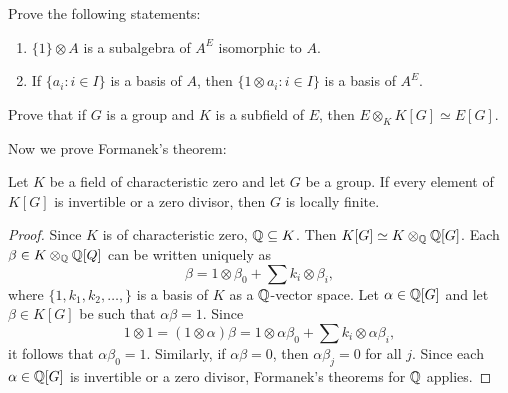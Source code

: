 \begin{exercise}
    Prove the following statements:
    \begin{enumerate}
		\item $\{1\}\otimes A$ is a subalgebra of $A^E$ isomorphic to $A$.
		\item If $\{a_i:i\in I\}$ is a basis of $A$, then $\{1\otimes a_i:i\in
			I\}$ is a basis of $A^E$.
	\end{enumerate}
\end{exercise}

\begin{exercise}
	Prove that if $G$ is a group and $K$ is a subfield of $E$, then
	$E\otimes_K K[G]\simeq E[G]$.
\end{exercise}

Now we prove Formanek's theorem:

\begin{theorem}[Formanek]
	Let $K$ be a field of characteristic zero and let $G$ be a group. 
	If every element of $K[G]$ is invertible or a zero divisor, 
	then $G$ is locally finite. 
\end{theorem}

\begin{proof}
	Since $K$ is of characteristic zero, $\mathbb{Q}\subseteq K$. Then $K[G]\simeq
	K\otimes_{\mathbb{Q}}\mathbb{Q}[G]$. Each $\beta\in K\otimes_{\mathbb{Q}}\mathbb{Q}[Q]$ can be written
	uniquely as 
	\[
		\beta=1\otimes\beta_0+\sum k_i\otimes\beta_i,
	\]
	where $\{1,k_1,k_2,\dots,\}$ is a basis of $K$ as a $\mathbb{Q}$-vector space. 
	Let $\alpha\in\mathbb{Q}[G]$ and let $\beta\in K[G]$ be such that $\alpha\beta=1$. Since
	\[
	1\otimes 1=(1\otimes\alpha)\beta=1\otimes \alpha\beta_0+\sum k_i\otimes \alpha\beta_i,
	\]
	it follows that $\alpha\beta_0=1$. Similarly, if
	$\alpha\beta=0$, then $\alpha\beta_j=0$ for all $j$. Since 
	each $\alpha\in\mathbb{Q}[G]$ is invertible or a zero divisor, Formanek's theorems 
	for $\mathbb{Q}$ applies. 
\end{proof}




